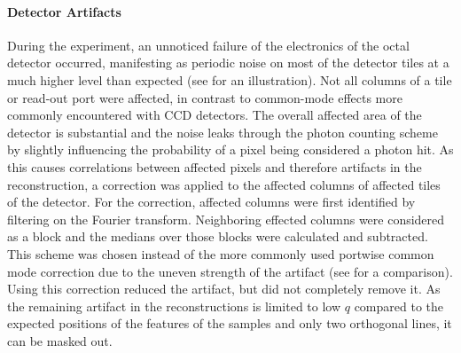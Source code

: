 \paragraph{Detector Artifacts}
During the experiment, an unnoticed failure of the electronics of the octal detector occurred, manifesting as periodic noise on most of the detector tiles at a much higher level than expected (see  for an illustration). Not all columns of a tile or read-out port were affected, in contrast to common-mode effects more commonly encountered with CCD detectors. The overall affected area of the detector is substantial and the noise leaks through the photon counting scheme by slightly influencing the probability of a pixel being considered a photon hit. As this causes correlations between affected pixels and therefore artifacts in the reconstruction, a correction was applied to the affected columns of affected tiles of the detector. For the correction, affected columns were first identified by filtering on the Fourier transform. Neighboring effected columns were considered as a block and the medians over those blocks were calculated and subtracted. This scheme was chosen instead of the more commonly used portwise common mode correction due to the uneven strength of the artifact (see  for a comparison). Using this correction reduced the artifact, but did not completely remove it. As the remaining artifact in the reconstructions is limited to low $q$ compared to the expected positions of the features of the samples and only two orthogonal lines, it can be masked out.


